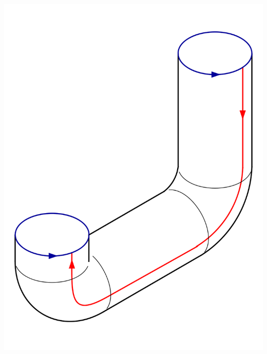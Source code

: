 \begin{example}
\begin{enumerate}[1)]
\begin{minipage}{\textwidth}
\begin{minipage}{0.3\textwidth}
                \end{minipage}
                \begin{minipage}{0.3\textwidth}
                    \includegraphics[width=\textwidth]{figures/800px-Klein_Bottle_Folding_3.svg.png}
                \end{minipage}
                \\
                \begin{minipage}{0.3\textwidth}

\end{minipage}
\end{minipage}
\end{enumerate}
\end{example}
